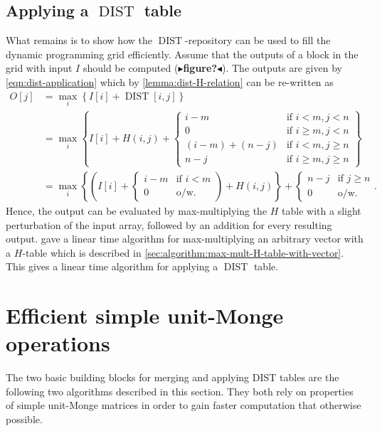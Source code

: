 \documentclass[twoside,11pt,openright]{report}
\newcommand{\todo}[1]{{\color[rgb]{.5,0,0}\textbf{$\blacktriangleright$#1$\blacktriangleleft$}}}
\newcommand{\DIST}{\operatorname{DIST}}
\begin{document}
\subsection{Applying a $\DIST$ table}
\label{sec:applying-a-dist-table}
What remains is to show how the $\DIST$-repository can be used to fill the dynamic programming grid efficiently. Assume that the outputs of a block in the grid with input $I$ should be computed (\todo{figure?}). The outputs are given by \cref{eqn:dist-application} which by \cref{lemma:dist-H-relation} can be re-written as
\begin{align*}
  O[j] &= \max_i \left\{ I[i] + \DIST[i, j] \right\} \\
    &= \max_i \left\{ I[i] + H(i, j) + \left\{
      \begin{array}{ll}
        i - m             & \text{if } i < m, j < n \\
        0                 & \text{if } i \geq m, j < n \\
        (i - m) + (n - j) & \text{if } i < m, j \geq n \\
        n - j             & \text{if } i \geq m, j \geq n
      \end{array}
    \right. \right\} \\
    &= \max_i\left\{ \left( I[i] + \left\{
      \begin{array}{ll}
        i - m     & \text{if } i < m \\
        0         & \text{o/w.}
      \end{array}
    \right. \right) + H(i, j) \right\} + \left\{
      \begin{array}{ll}
        n - j     & \text{if } j \geq n \\
        0         & \text{o/w.}
      \end{array}
    \right. .
\end{align*}
Hence, the output can be evaluated by max-multiplying the $H$ table with a slight perturbation of the input array, followed by an addition for every resulting output. \cite{Gawrychowski:2012:FAC:2422024.2422048} gave a linear time algorithm for max-multiplying an arbitrary vector with a $H$-table which is described in \cref{sec:algorithm:max-mult-H-table-with-vector}. This gives a linear time algorithm for applying a $\DIST$ table.

\section{Efficient simple unit-Monge operations}
The two basic building blocks for merging and applying DIST tables are the following two algorithms described in this section. They both rely on properties of simple unit-Monge matrices in order to gain faster computation that otherwise possible.
\end{document}
